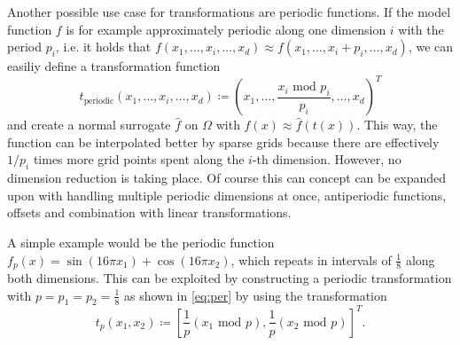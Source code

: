 \documentclass[
  a4paper,  %
  twoside,  %
  bibliography=totoc,
  headsepline,
  cleardoublepage=empty,
  parskip=half,
  draft=false
]{scrbook}
\begin{document}
Another possible use case for transformations are periodic functions.
If the model function $f$ is for example approximately periodic along one dimension $i$ with the period $p_i$, i.e. it holds that $f(x_1,\dots,x_i,\dots,x_d) \approx f(x_1,\dots,x_i + p_i, \dots,x_d)$, we can easiliy define a transformation function
\begin{equation}
t_{\text{periodic}}(x_1,\dots,x_i,\dots,x_d) \coloneqq (x_1,\dots, \frac{x_i\text{ mod } p_i}{p_i}, \dots,x_d)^T
\label{eq:per}
\end{equation}
and create a normal surrogate $\hat{f}$ on $\Omega$ with $f(x) \approx \hat{f}(t(x))$.
This way, the function can be interpolated better by sparse grids because there are effectively $1 / p_i$ times more grid points spent along the $i$-th dimension.
However, no dimension reduction is taking place.
Of course this can concept can be expanded upon with handling multiple periodic dimensions at once, antiperiodic functions, offsets and combination with linear transformations.

A simple example would be the periodic function $f_p(x)=\sin(16\pi x_1)  + \cos(16\pi x_2)$, which repeats in intervals of $\frac{1}{8}$ along both dimensions.
This can be exploited by constructing a periodic transformation with $p=p_1=p_2=\frac{1}{8}$ as shown in \cref{eq:per} by using the transformation
\begin{equation}
t_p(x_1,x_2) \coloneqq \left[\frac{1}{p} \left(x_1 \text{ mod } p\right), \frac{1}{p} \left(x_2 \text{ mod } p\right)\right]^T.
\nonumber
\end{equation}
\end{document}
